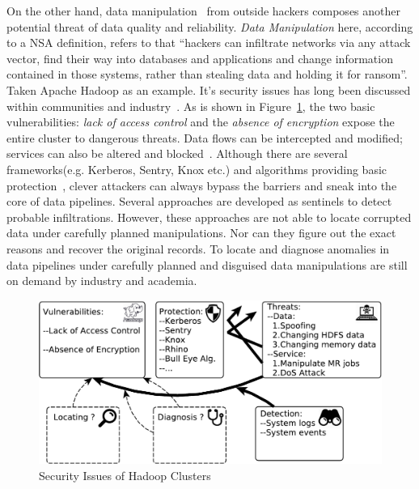 \documentclass[a4paper]{IEEEtran}
\begin{document}
		On the other hand, data manipulation~\autocite{dataManipulation} from outside hackers composes another potential threat of data quality and reliability. \textit{Data Manipulation} here, according to a NSA definition, refers to that ``hackers can infiltrate networks via any attack vector, find their way into databases and applications and change information contained in those systems, rather than stealing data and holding it for ransom''. Taken Apache Hadoop as an example. It's security issues has long been discussed within communities and industry~\autocite{sharif2015current,terzi2015survey,jam2014survey,sharma2014securing}. As is shown in Figure~\ref{fig:hadoop-security}, the two basic vulnerabilities: \textit{lack of access control} and the \textit{absence of encryption} expose the entire cluster to dangerous threats. Data flows can be intercepted and modified; services can also be altered and blocked~\autocite{huang2014denial}. Although there are several frameworks(e.g. Kerberos, Sentry, Knox etc.) and algorithms providing basic protection~\autocite{zheng2017towards,sikdar2017spatio,xu2016high,yu2015enhancing,cohen2014towards}, clever attackers can always bypass the barriers and sneak into the core of data pipelines. Several approaches are developed as sentinels to detect probable infiltrations. However, these approaches are not able to locate corrupted data under carefully planned manipulations. Nor can they figure out the exact reasons and recover the original records. To locate and diagnose anomalies in data pipelines under carefully planned and disguised data manipulations are still on demand by industry and academia.
		
		\begin{figure}[!t]
			\includegraphics[width=\linewidth]{fig/HadoopSecurity}
			\caption{Security Issues of Hadoop Clusters}
			\label{fig:hadoop-security}
		\end{figure}
\end{document}
